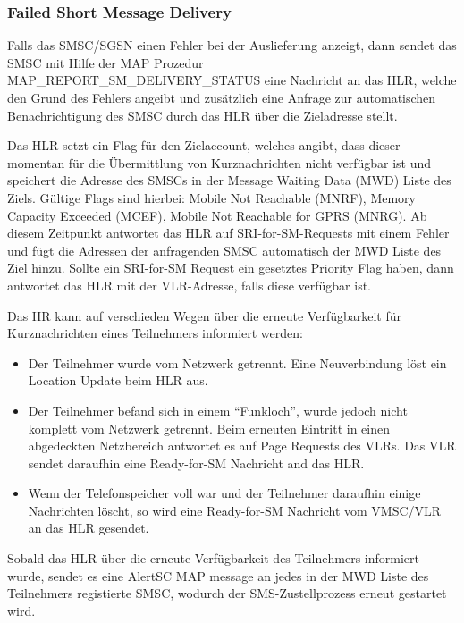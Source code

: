 \documentclass[german,12pt,a4paper]{article}
\begin{document}
\subsubsection{Failed Short Message Delivery}
Falls das SMSC/SGSN einen Fehler bei der Auslieferung anzeigt, dann sendet das SMSC mit Hilfe der 
MAP Prozedur MAP\_REPORT\_SM\_DELIVERY\_STATUS eine Nachricht an das HLR, welche den Grund des Fehlers
angeibt und zusätzlich eine Anfrage zur automatischen Benachrichtigung des SMSC durch das HLR über die 
Zieladresse stellt.

Das HLR setzt ein Flag für den Zielaccount, welches angibt, dass dieser momentan für die Übermittlung von 
Kurznachrichten nicht verfügbar ist und speichert die Adresse des SMSCs in der Message Waiting Data (MWD) 
Liste des Ziels. Gültige Flags sind hierbei: Mobile Not Reachable (MNRF), Memory Capacity Exceeded (MCEF), 
Mobile Not Reachable for GPRS (MNRG). Ab diesem Zeitpunkt antwortet das HLR auf SRI-for-SM-Requests mit 
einem Fehler und fügt die Adressen der anfragenden SMSC automatisch der MWD Liste des Ziel hinzu. Sollte 
ein SRI-for-SM Request ein gesetztes Priority Flag haben, dann antwortet das HLR mit der VLR-Adresse, 
falls diese verfügbar ist.

Das HR kann auf verschieden Wegen über die erneute Verfügbarkeit für Kurznachrichten eines Teilnehmers 
informiert werden:
\begin{itemize}
    \item Der Teilnehmer wurde vom Netzwerk getrennt. Eine Neuverbindung löst ein Location Update beim 
    HLR aus.
    \item Der Teilnehmer befand sich in einem ``Funkloch'', wurde jedoch nicht komplett vom Netzwerk
    getrennt. Beim erneuten Eintritt in einen abgedeckten Netzbereich antwortet es auf Page Requests
    des VLRs. Das VLR sendet daraufhin eine Ready-for-SM Nachricht and das HLR.
    \item Wenn der Telefonspeicher voll war und der Teilnehmer daraufhin einige Nachrichten löscht, so
    wird eine Ready-for-SM Nachricht vom VMSC/VLR an das HLR gesendet.
\end{itemize}

Sobald das HLR über die erneute Verfügbarkeit des Teilnehmers informiert wurde, sendet es eine AlertSC 
MAP message an jedes in der MWD Liste des Teilnehmers registierte SMSC, wodurch der SMS-Zustellprozess
erneut gestartet wird.
\end{document}
